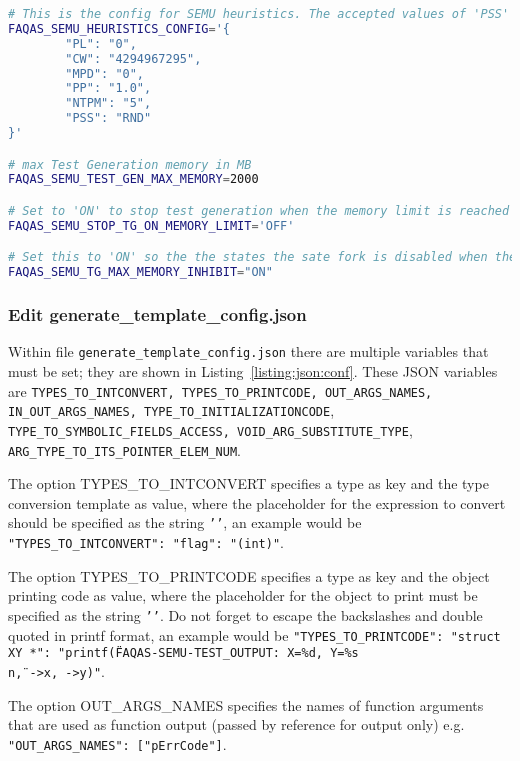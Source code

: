 \begin{lstlisting}[language=bash,label=listing:ASN:conf,caption=faqas\_semus\_conf.sh file for ASN case study.]
# This is the config for SEMU heuristics. The accepted values of 'PSS' are 'RND' for random and 'MDO' for minimum distance to output
FAQAS_SEMU_HEURISTICS_CONFIG='{
        "PL": "0",
        "CW": "4294967295",
        "MPD": "0",
        "PP": "1.0",
        "NTPM": "5",
        "PSS": "RND"
}'

# max Test Generation memory in MB
FAQAS_SEMU_TEST_GEN_MAX_MEMORY=2000

# Set to 'ON' to stop test generation when the memory limit is reached
FAQAS_SEMU_STOP_TG_ON_MEMORY_LIMIT='OFF'

# Set this to 'ON' so the the states the sate fork is disabled when the memory limit is reached, to avoid going much over it
FAQAS_SEMU_TG_MAX_MEMORY_INHIBIT="ON"
\end{lstlisting}


\subsubsection{Edit generate\_template\_config.json}
\label{sec:json_config}

Within file \texttt{generate\_template\_config.json} there are multiple variables that must be set; they are shown in Listing~\ref{listing:json:conf}. These JSON variables are \texttt{TYPES\_TO\_INTCONVERT, TYPES\_TO\_PRINTCODE, OUT\_ARGS\_NAMES, IN\_OUT\_ARGS\_NAMES, TYPE\_TO\_INITIALIZATIONCODE}, \\
\texttt{TYPE\_TO\_SYMBOLIC\_FIELDS\_ACCESS, VOID\_ARG\_SUBSTITUTE\_TYPE},\\
\texttt{ARG\_TYPE\_TO\_ITS\_POINTER\_ELEM\_NUM}.

The option TYPES\_TO\_INTCONVERT specifies a type as key and the type conversion template as value, where the placeholder for the expression to convert should be specified as the string \texttt{'{}'}, an example would be \texttt{"TYPES\_TO\_INTCONVERT": {"flag": "(int){}"}}.

The option TYPES\_TO\_PRINTCODE specifies a type as key and the object printing code as value, where the placeholder for the object to print must be specified as the string \texttt{'{}'}. Do not forget to escape the backslashes and double quoted in printf format, an example would be \texttt{"TYPES\_TO\_PRINTCODE": {"struct XY *": "printf(\"FAQAS-SEMU-TEST\_OUTPUT: X=\%d, Y=\%s\\n\", {}->x, {}->y)"}}.

The option OUT\_ARGS\_NAMES specifies the names of function arguments that are used as function output (passed by reference for output only) e.g. \texttt{"OUT\_ARGS\_NAMES": ["pErrCode"]}.


